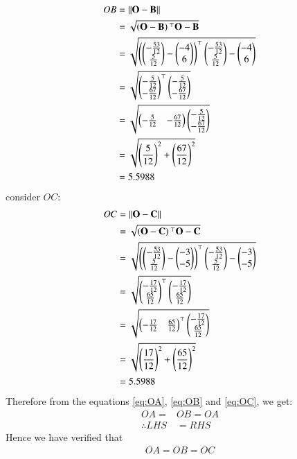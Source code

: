 \documentclass[journal,12pt,twocolumn]{IEEEtran}
\theoremstyle{remark}
\begin{document}
\begin{align} 
OB &= \left\lVert\mathbf{O} - \mathbf{B}\right\rVert\\
&= \sqrt{\left(\mathbf{O}-\mathbf{B}\right){^\top}\mathbf{O}-\mathbf{B}}\\
&= \sqrt{\left(\begin{pmatrix}-\frac{53}{12} \\ \frac{5}{12}\end{pmatrix} - \begin{pmatrix}-4\\6\end{pmatrix}\right)^{\top}\begin{pmatrix}-\frac{53}{12}\\\frac{5}{12}\end{pmatrix} - \begin{pmatrix}-4\\6\end{pmatrix}}\\
&= \sqrt{\begin{pmatrix}-\frac{5}{12} \\ -\frac{67}{12}\end{pmatrix}^{\top}\begin{pmatrix}-\frac{5}{12} \\ -\frac{67}{12}\end{pmatrix}}\\
&= \sqrt{\begin{pmatrix}-\frac{5}{12} & -\frac{67}{12}\end{pmatrix} \begin{pmatrix}-\frac{5}{12} \\ -\frac{67}{12}\end{pmatrix}}\\
&= \sqrt{\left(\frac{5}{12}\right)^2 + \left(\frac{67}{12}\right)^2}\\
&= 5.5988 \label{eq:OB}
\end{align}
consider $OC$:
\begin{align} 
OC &= \left\lVert\mathbf{O} - \mathbf{C}\right\rVert\\
&= \sqrt{\left(\mathbf{O}-\mathbf{C}\right){^\top}\mathbf{O}-\mathbf{C}}\\
&= \sqrt{\left(\begin{pmatrix}-\frac{53}{12} \\ \frac{5}{12}\end{pmatrix} - \begin{pmatrix}-3\\-5\end{pmatrix}\right)^{\top}\begin{pmatrix}-\frac{53}{12}\\\frac{5}{12}\end{pmatrix} - \begin{pmatrix}-3\\-5\end{pmatrix}}\\
&= \sqrt{\begin{pmatrix}-\frac{17}{12} \\ \frac{65}{12}\end{pmatrix}^{\top}\begin{pmatrix}-\frac{17}{12} \\ \frac{65}{12}\end{pmatrix}}\\
&= \sqrt{\begin{pmatrix}-\frac{17}{12} & \frac{65}{12}\end{pmatrix}^{\top}\begin{pmatrix}-\frac{17}{12} \\ \frac{65}{12}\end{pmatrix}}\\
&= \sqrt{\left(\frac{17}{12}\right)^2 + \left(\frac{65}{12}\right)^2}\\
&= 5.5988 \label{eq:OC}
\end{align}
Therefore from the equations \eqref{eq:OA}, \eqref{eq:OB} and \eqref{eq:OC}, we get:
\begin{align}
OA = &OB = OA\\
\therefore LHS &= RHS
\end{align}
Hence we have verified that \begin{align} OA = OB = OC \end{align}
\end{document}
